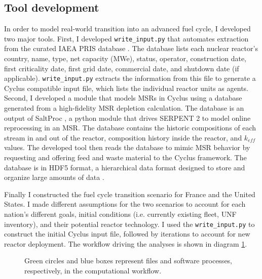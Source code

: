 \subsection{Tool development}
In order to model real-world transition into an advanced
fuel cycle, I developed two major tools. First, I developed \texttt{write\_input.py}
that automates extraction from the curated \gls{IAEA} \gls{PRIS} database
\cite{iaea_nuclear_2018}. The database lists each nuclear reactor's
country, name, type, net capacity (\gls{MWe}), status, operator, construction
date, first criticality date, first grid date, commercial date, and shutdown
date (if applicable). \texttt{write\_input.py} extracts the information from this file
to generate a Cyclus compatible input file, which lists the individual
reactor units as agents. Second, I developed a module that models \glspl{MSR}
in Cyclus using a database generated from a high-fidelity \gls{MSR} depletion calculation.
The database is an output of SaltProc \cite{rykhlevskii_arfc/saltproc:_2018}, a python
module that drives
SERPENT 2 \cite{leppanen_serpentcontinuous-energy_2013} to model online reprocessing in an \gls{MSR}.
The database contains the historic compositions of each stream in and out of the reactor,
composition history inside the reactor, and $k_{eff}$ values. The developed tool then
reads the database to mimic \gls{MSR} behavior by requesting and offering
feed and waste material to the Cyclus framework. The database is in HDF5
format, a hierarchical data format designed to store and organize
large amounts of data \cite{the_hdf_group_hierarchical_1997}.

Finally I constructed the fuel cycle transition scenario for France and the United States.
I made different assumptions for the two scenarios to account for each nation's different goals,
initial conditions (i.e. currently existing fleet, \gls{UNF} inventory), and their potential reactor
technology. I used the \texttt{write\_input.py} to construct the initial Cyclus input file,
followed by iterations to account for new reactor deployment. The workflow driving the analyses is shown in diagram \ref{diag:workflow}.


\begin{figure}
        \centering
{}
\caption{Green circles and blue boxes represent files and software 
processes, respectively, in the computational workflow.}
\label{diag:workflow}
\end{figure}



